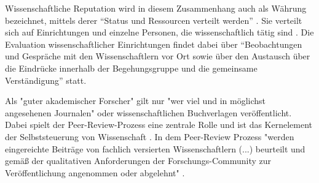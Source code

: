 Wissenschaftliche Reputation wird in diesem Zusammenhang auch als Währung bezeichnet, mittels derer “Status und Ressourcen verteilt werden” \cite{hanekop_2006}. Sie verteilt sich auf Einrichtungen und einzelne Personen, die wissenschaftlich tätig sind \cite{suchen}. Die Evaluation wissenschaftlicher Einrichtungen findet dabei über “Beobachtungen und Gespräche mit den Wissenschaftlern vor Ort sowie über den Austausch über die Eindrücke innerhalb der Begehungsgruppe und die gemeinsame Verständigung”\cite{Barl_sius_2008} statt.

Als "guter akademischer Forscher" gilt nur "wer viel und in möglichst angesehenen Journalen" \cite{Frey_2005} oder wissenschaftlichen Buchverlagen veröffentlicht. Dabei spielt der Peer-Review-Prozess eine zentrale Rolle und ist das Kernelement der Selbststeuerung von Wissenschaft \cite{Neidhardt_2010}. In dem Peer-Review Prozess "werden eingereichte Beiträge von fachlich versierten Wissenschaftlern (...) beurteilt und gemäß der qualitativen Anforderungen der Forschungs-Community zur Veröffentlichung angenommen oder abgelehnt" \cite{Hess_2006}.

